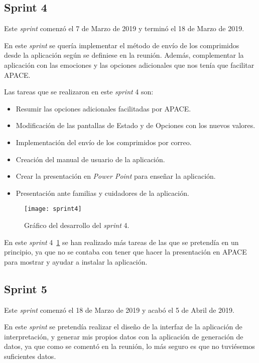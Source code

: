 \subsection{Sprint 4}
Este \textit{sprint} comenzó el 7 de Marzo de 2019 y terminó el 18 de Marzo de 2019.

En este \textit{sprint} se quería implementar el método de envío de los comprimidos desde la aplicación según se definiese en la reunión. Además, complementar la aplicación con las emociones y las opciones adicionales que nos tenía que facilitar APACE.

Las tareas que se realizaron en este \textit{sprint} 4 son:
\begin{itemize}
	\item Resumir las opciones adicionales facilitadas por APACE.
	\item Modificación de las pantallas de Estado y de Opciones con los nuevos valores.
	\item Implementación del envío de los comprimidos por correo.
	\item Creación del manual de usuario de la aplicación.
	\item Crear la presentación en \textit{Power Point} para enseñar la aplicación.
	\item Presentación ante familias y cuidadores de la aplicación.
\end{itemize}

\begin{figure}
	\centering
	\texttt{[image: sprint4]}
	\caption{Gráfico del desarrollo del \textit{sprint} 4.}
	\label{fig:sprint4}
\end{figure}

En este \textit{sprint} 4~\ref{fig:sprint4} se han realizado más tareas de las que se pretendía en un principio, ya que no se contaba con tener que hacer la presentación en APACE para mostrar y ayudar a instalar la aplicación.

\subsection{Sprint 5}
Este \textit{sprint} comenzó el 18 de Marzo de 2019 y acabó el 5 de Abril de 2019.

En este \textit{sprint} se pretendía realizar el diseño de la interfaz de la aplicación de interpretación, y generar mis propios datos con la aplicación de generación de datos, ya que como se comentó en la reunión, lo más seguro es que no tuviésemos suficientes datos.

